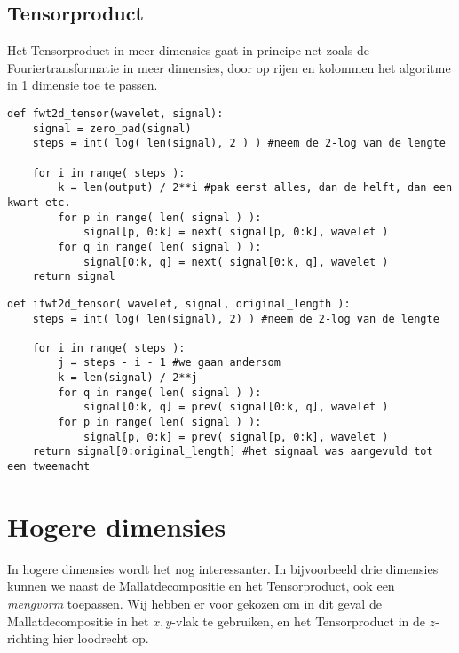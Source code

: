 \subsection{Tensorproduct}
Het Tensorproduct in meer dimensies gaat in principe net zoals de Fouriertransformatie in meer dimensies, door op rijen en kolommen het algoritme in 1 dimensie toe te passen.
\begin{lstlisting}[caption=De 2d FWT in het Tensorgeval]
def fwt2d_tensor(wavelet, signal):
	signal = zero_pad(signal)
	steps = int( log( len(signal), 2 ) ) #neem de 2-log van de lengte
	
	for i in range( steps ):
		k = len(output) / 2**i #pak eerst alles, dan de helft, dan een kwart etc.
		for p in range( len( signal ) ):
			signal[p, 0:k] = next( signal[p, 0:k], wavelet )
		for q in range( len( signal ) ):
			signal[0:k, q] = next( signal[0:k, q], wavelet )
	return signal
\end{lstlisting}
\begin{lstlisting}[caption=De 2d iFWT in het Tensorgeval]
def ifwt2d_tensor( wavelet, signal, original_length ):
	steps = int( log( len(signal), 2) ) #neem de 2-log van de lengte
	
	for i in range( steps ):
		j = steps - i - 1 #we gaan andersom
		k = len(signal) / 2**j
		for q in range( len( signal ) ):
			signal[0:k, q] = prev( signal[0:k, q], wavelet )
		for p in range( len( signal ) ):
			signal[p, 0:k] = prev( signal[p, 0:k], wavelet )
	return signal[0:original_length] #het signaal was aangevuld tot een tweemacht
\end{lstlisting}

\section{Hogere dimensies}
In hogere dimensies wordt het nog interessanter. In bijvoorbeeld drie dimensies kunnen we naast de Mallatdecompositie en het Tensorproduct, ook een \emph{mengvorm} toepassen. Wij hebben er voor gekozen om in dit geval de Mallatdecompositie in het $x,y$-vlak te gebruiken, en het Tensorproduct in de $z$-richting hier loodrecht op.

